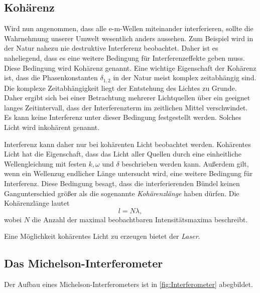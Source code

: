 \subsection{Kohärenz}
\label{subsec:Kohärenz}
Wird nun angenommen, dass alle e-m-Wellen miteinander interferieren, sollte die Wahrnehmung unserer Umwelt wesentlich anders aussehen. Zum Beispiel wird in der Natur nahezu 
nie destruktive Interferenz beobachtet. Daher ist es naheliegend, dass es eine weitere Bedingung für Interferenzeffekte geben muss. Diese Bedingung wird Kohärenz genannt. 
Eine wichtige Eigenschaft der Kohärenz ist, dass die Phasenkonstanten $\delta_{1,2}$ in der Natur meist komplex zeitabhängig sind. Die komplexe Zeitabhängigkeit liegt der 
Entstehung des Lichtes zu Grunde. Daher ergibt sich bei einer Betrachtung mehrerer Lichtquellen über ein geeignet langes Zeitintervall, dass der Interferenzterm im zeitlichen 
Mittel verschwindet. Es kann keine Interferenz unter dieser Bedingung festgestellt werden. Solches Licht wird inkohärent genannt. 

Interferenz kann daher nur bei kohärenten Licht beobachtet werden. Kohärentes Licht hat die Eigenschaft, dass das Licht aller Quellen durch eine einheitliche Wellengleichung 
mit festen $k, \omega$ und $\delta$ beschrieben werden kann. Außerdem gilt, wenn ein Wellenzug endlicher Länge untersucht wird, eine weitere Bedingung für Interferenz. 
Diese Bedingung besagt, dass die interferierenden Bündel keinen Gangunterschied größer als die sogenannte \textit{Kohärenzlänge} haben dürfen. Die Kohärenzlänge lautet 
\begin{equation*}
    l = N\lambda,
\end{equation*}  
wobei $N$ die Anzahl der maximal beobachtbaren Intensitätsmaxima beschreibt. 

Eine Möglichkeit kohärentes Licht zu erzeugen bietet der \textit{Laser}. 

\subsection{Das Michelson-Interferometer}
\label{subsec:Interferometer}
Der Aufbau eines Michelson-Interferometers ist in \autoref{fig:Interferometer} abegbildet. 


